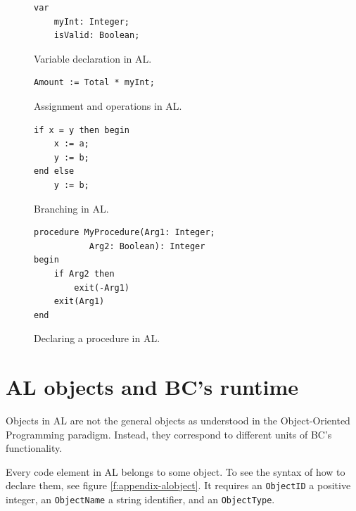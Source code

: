 \begin{figure}
    \begin{minipage}{.45\textwidth}
        \begin{Verbatim}[fontsize=\tiny]
var
    myInt: Integer;
    isValid: Boolean;
        \end{Verbatim}
        \parbox{0.9\textwidth}{
            \caption{Variable declaration in AL.}
        \label{fig:al-var-decl}
            }
    \end{minipage}%
    \begin{minipage}{.45\textwidth}
        \begin{Verbatim}[fontsize=\tiny]
Amount := Total * myInt;
        \end{Verbatim}
        \caption{Assignment and operations in AL.}
    \end{minipage}
\end{figure}

\begin{figure}
    \begin{minipage}{.45\textwidth}
        \begin{Verbatim}[fontsize=\tiny]
if x = y then begin  
    x := a;  
    y := b;  
end else 
    y := b;   
        \end{Verbatim}
        \parbox{0.9\textwidth}{\caption{Branching in AL.}}
    \end{minipage}%
    \begin{minipage}{.45\textwidth}
        \begin{Verbatim}[fontsize=\tiny]
procedure MyProcedure(Arg1: Integer; 
           Arg2: Boolean): Integer
begin
    if Arg2 then
        exit(-Arg1)
    exit(Arg1)
end
        \end{Verbatim}
        \parbox{0.9\textwidth}{
            \caption{Declaring a procedure in AL.}
        \label{fig:al-proc-decl}
            }
    \end{minipage}%

\end{figure}

\section{AL objects and BC's runtime}
Objects in AL are not the general objects as understood in the Object-Oriented Programming paradigm. Instead,
they correspond to different units of BC's functionality.

Every code element in AL belongs to some object. To see the syntax of how to declare them, see figure \ref{f:appendix-alobject}.
It requires an \texttt{ObjectID} a positive integer, an \texttt{ObjectName} a string identifier, and an \texttt{ObjectType}.

